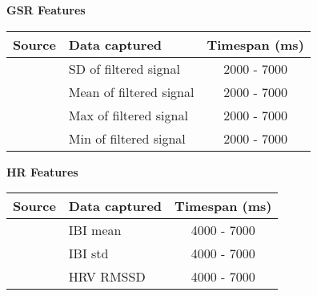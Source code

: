 \begin{table}[H]
    \centering
    {\large \textbf{GSR Features}}\vspace{2pt}
    \begin{tabularx}{\columnwidth}{cXc}
        \toprule
        \textbf{Source} & \textbf{Data captured} & \textbf{Timespan (ms)}\\
        \midrule
        \cite{gsr_len_lat3, gsr_data_processing} & SD of filtered signal & 2000 - 7000\\
        \cite{gsr_len_lat3, gsr_data_processing} & Mean of filtered signal & 2000 - 7000\\
        \cite{gsr_len_lat3, gsr_data_processing} & Max of filtered signal & 2000 - 7000\\
        \cite{gsr_len_lat3, gsr_data_processing} & Min of filtered signal & 2000 - 7000\\
        \bottomrule
    \end{tabularx}
    \label{[TABLE] features gsr}
\end{table}

\begin{table}[H]
    \centering
    {\large \textbf{HR Features}}\vspace{2pt}
    \begin{tabularx}{\columnwidth}{cXc}
        \toprule
        \textbf{Source}                  & \textbf{Data captured} & \textbf{Timespan (ms)} \\
        \midrule
        \cite{hr_feature1, hrv_source_3} & IBI mean               & 4000 - 7000            \\
        \cite{hr_feature1}               & IBI std                & 4000 - 7000            \\
        \cite{hr_feature1}               & HRV RMSSD              & 4000 - 7000            \\
        \bottomrule
    \end{tabularx}
    \label{[TABLE] features hr}
\end{table}

